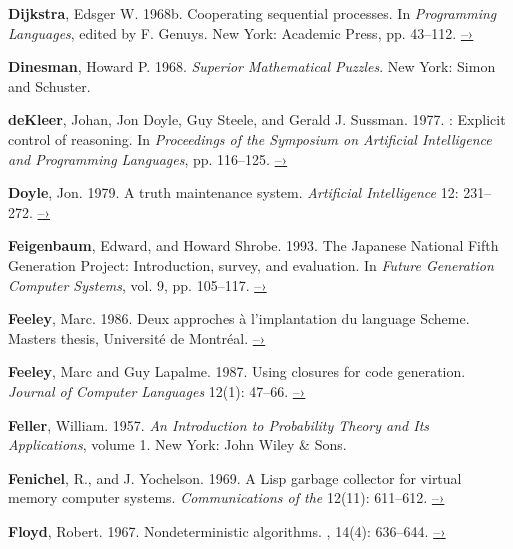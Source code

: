  \label{Dijkstra 1968b}
\textbf{Dijkstra}, Edsger W. 1968b.  Cooperating sequential processes.  In
\textit{Programming Languages}, edited by F. Genuys. New York: Academic Press,
pp.  43--112.
\href{http://www.cs.utexas.edu/users/EWD/ewd01xx/EWD123.PDF}{–›}

 \label{Dinesman 1968}
\textbf{Dinesman}, Howard P.  1968.  \textit{Superior Mathematical Puzzles}.  New York:
Simon and Schuster.

 \label{deKleer et al. 1977}
\textbf{deKleer}, Johan, Jon Doyle, Guy Steele, and Gerald J. Sussman.  1977.
: Explicit control of reasoning.  In \textit{Proceedings of the
 Symposium on Artificial Intelligence and Programming Languages},
pp.  116--125.
\href{http://dspace.mit.edu/handle/1721.1/5750}{–›}

 \label{Doyle (1979)}
\textbf{Doyle}, Jon. 1979. A truth maintenance system. \textit{Artificial Intelligence}
12: 231--272.
\href{http://dspace.mit.edu/handle/1721.1/5733}{–›}

 \label{Feigenbaum and Shrobe 1993}
\textbf{Feigenbaum}, Edward, and Howard Shrobe. 1993. The Japanese National Fifth
Generation Project: Introduction, survey, and evaluation.  In \textit{Future
Generation Computer Systems}, vol. 9, pp. 105--117.
\href{https://saltworks.stanford.edu/assets/kv359wz9060.pdf}{–›}

 \label{Feeley (1986)}
\textbf{Feeley}, Marc.  1986.  Deux approches \`a l'implantation du language
Scheme.  Masters thesis, Universit\'e de Montr\'eal.
\href{http://www.iro.umontreal.ca/~feeley/papers/FeeleyMSc.pdf}{–›}

 \label{Feeley and Lapalme 1987}
\textbf{Feeley}, Marc and Guy Lapalme.  1987.  Using closures for code generation.
\textit{Journal of Computer Languages} 12(1): 47--66.
\href{http://citeseerx.ist.psu.edu/viewdoc/summary?doi=10.1.1.90.6978}{–›}

\textbf{Feller}, William.  1957.  \textit{An Introduction to Probability Theory and Its
Applications}, volume 1. New York: John Wiley \& Sons.

 \label{Fenichel and Yochelson (1969)}
\textbf{Fenichel}, R., and J. Yochelson.  1969.  A Lisp garbage collector for virtual
memory computer systems.  \textit{Communications of the }
12(11): 611--612.
\href{https://www.cs.purdue.edu/homes/hosking/690M/p611-fenichel.pdf}{–›}

 \label{Floyd (1967)}
\textbf{Floyd}, Robert. 1967. Nondeterministic algorithms. \textit{},
14(4): 636--644.
\href{http://citeseerx.ist.psu.edu/viewdoc/summary?doi=10.1.1.332.36}{–›}


